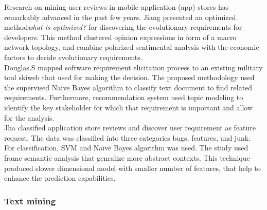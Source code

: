 Research on mining user reviews in mobile application (app) stores has
remarkably advanced in the past few years. Jiang \etal
\cite{Jiang:2014} presented an optimized method\emph{what is optimized?} for
discovering the evolutionary requirements for developers. This method clustered opinion expressions in form of a macro network
topology, and combine polarized sentimental analysis with the economic factors
to decide evolutionary requirements. \\

Douglas.S \etal\cite{Douglas:S2008} mapped software requirement elicitation process to an
existing military tool skiweb that used for making the decision. The proposed
methodology used the supervised Naive Bayes algorithm to classify text document
to find related requirements. Furthermore, recommendation system used topic modeling to
identify the key stakeholder for which that requirement is important and allow
for the analysis.\\

Jha \etal \cite{Jha:2017} classified application store reviews and discover user
requirement as feature request. The data was classified into three categories bugs,
features, and junk. For classification, SVM and Naïve Bayes algorithm was used.
The study used frame semantic analysis that genralize more abstract contexts.
This technique produced slower dimensional model with smaller number of
features, that help to enhance the prediction capabilities.\\


\subsubsection{Text mining}

